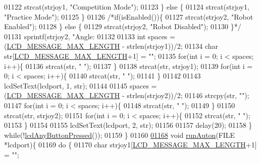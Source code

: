 \begin{DoxyCode}
{{{{{{{{{{{{{{01122             strcat(strjoy1, \textcolor{stringliteral}{"Competition Mode"});
01123         \} \textcolor{keywordflow}{else} \{
01124             strcat(strjoy1, \textcolor{stringliteral}{"Practice Mode"});
01125         \}
01126         \textcolor{comment}{/*if(isEnabled())\{}
01127 \textcolor{comment}{            strcat(strjoy2, "Robot Enabled");}
01128 \textcolor{comment}{        \} else \{}
01129 \textcolor{comment}{            strcat(strjoy2, "Robot Disabled");}
01130 \textcolor{comment}{        \}*/}
01131         sprintf(strjoy2, \textcolor{stringliteral}{"Angle: %
01132 
01133         \textcolor{keywordtype}{int} spaces = (\hyperlink{lcdmsg_8h_abe4c4b70fc6f44ae3680e5b2c68cdd00}{LCD\_MESSAGE\_MAX\_LENGTH} - strlen(strjoy1))/2;
01134         \textcolor{keywordtype}{char} str[\hyperlink{lcdmsg_8h_abe4c4b70fc6f44ae3680e5b2c68cdd00}{LCD\_MESSAGE\_MAX\_LENGTH}+1] = \textcolor{stringliteral}{""};
01135         \textcolor{keywordflow}{for}(\textcolor{keywordtype}{int} i = 0; i < spaces; i++)\{
01136             strcat(str, \textcolor{stringliteral}{" "});
01137         \}
01138         strcat(str, strjoy1);
01139         \textcolor{keywordflow}{for}(\textcolor{keywordtype}{int} i = 0; i < spaces; i++)\{
01140             strcat(str, \textcolor{stringliteral}{" "});
01141         \}
01142 
01143         lcdSetText(lcdport, 1, str);
01144 
01145         spaces = (\hyperlink{lcdmsg_8h_abe4c4b70fc6f44ae3680e5b2c68cdd00}{LCD\_MESSAGE\_MAX\_LENGTH} - strlen(strjoy2))/2;
01146         strcpy(str, \textcolor{stringliteral}{""});
01147         \textcolor{keywordflow}{for}(\textcolor{keywordtype}{int} i = 0; i < spaces; i++)\{
01148             strcat(str, \textcolor{stringliteral}{" "});
01149         \}
01150         strcat(str, strjoy2);
01151         \textcolor{keywordflow}{for}(\textcolor{keywordtype}{int} i = 0; i < spaces; i++)\{
01152             strcat(str, \textcolor{stringliteral}{" "});
01153         \}
01154 
01155         lcdSetText(lcdport, 2, str);
01156 
01157         delay(20);
01158     \} \textcolor{keywordflow}{while}(!\hyperlink{lcddiag_8h_a0592813f995bfeeadb9bee923833ed35}{lcdAnyButtonPressed}());
01159 \}
01160 
\hypertarget{lcddiag_8c_source.tex_l01168}{}\hyperlink{lcddiag_8c_a6ef180c90194ad9d2d4f6cde9a535fdb}{01168} \textcolor{keywordtype}{void} \hyperlink{lcddiag_8c_a6ef180c90194ad9d2d4f6cde9a535fdb}{runAuton}(FILE *lcdport)\{
01169     \textcolor{keywordflow}{do} \{
01170         \textcolor{keywordtype}{char} strjoy1[\hyperlink{lcdmsg_8h_abe4c4b70fc6f44ae3680e5b2c68cdd00}{LCD\_MESSAGE\_MAX\_LENGTH}+1] = \textcolor{stringliteral}{""};
}}}}}}}}}}}}}}}
\end{DoxyCode}
